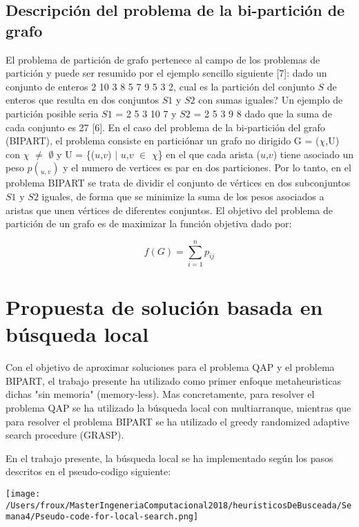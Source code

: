 \documentclass{article}
\begin{document}
\subsection{Descripción del problema de la bi-partición de grafo}
El problema de partición de grafo pertenece al campo de los problemas de partición y puede ser resumido por el ejemplo sencillo siguiente [7]: dado un conjunto de enteros 2 10 3 8 5 7 9 5 3 2, cual es la partición del conjunto $S$ de enteros que resulta en dos conjuntos $S1$ y $S2$ con sumas iguales? Un ejemplo de partición posible seria $S1$ = 2 5 3 10 7 y $S2$ = 2 5 3 9 8 dado que la suma de cada conjunto es 27 [6]. En el caso del problema de la bi-partición del grafo (BIPART), el problema consiste en particiónar un grafo no dirigido G = ($\chi$,U) con $\chi$ $\neq$ $\emptyset$ y U = \{($u$,$v$) $\mid$ $u$,$v$ $\in$ $\chi$\} en el que cada arista ($u$,$v$) tiene asociado un peso $p(_{u,v})$ y el numero de vertices es par en dos particiones. Por lo tanto, en el problema BIPART se trata de dividir el conjunto de vértices en dos subconjuntos $S1$ y $S2$ iguales, de forma que se minimize la suma de los pesos asociados a aristas que unen vértices de diferentes conjuntos. El objetivo del problema de partición de un grafo es de maximizar la función objetiva dado por:\newline

 \begin{equation}
	f(G)=\sum_{i=1}^{n}p_{ij}
\end{equation}

 \section{Propuesta de solución basada en búsqueda local}
 Con el objetivo de aproximar soluciones para el problema QAP y el problema BIPART, el trabajo presente ha utilizado como primer enfoque metaheuristicas dichas "sin memoria" (memory-less). Mas concretamente, para resolver el problema QAP se ha utilizado la búsqueda local con multiarranque, mientras que para resolver el problema BIPART se ha utilizado el greedy randomized adaptive search procedure (GRASP).\newline
 
En el trabajo presente, la búsqueda local se ha implementado según los pasos descritos en el pseudo-codigo siguiente:
\begin{center} 
 \texttt{[image: /Users/froux/MasterIngeneriaComputacional2018/heuristicosDeBusceada/Semana4/Pseudo-code-for-local-search.png]}
 \end{center}
 
\end{document}
